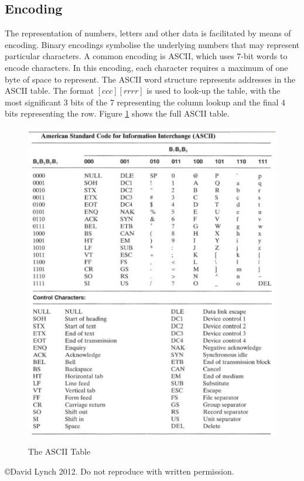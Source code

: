 \documentclass[10pt,a4paper]{article}
\begin{document}
\subsection{Encoding}
The representation of numbers, letters and other data is facilitated by means of encoding. Binary encodings symbolise the underlying numbers that may represent particular characters. A common encoding is ASCII, which uses 7-bit words to encode characters. In this encoding, each character requires a maximum of one byte of space to represent. The ASCII word structure represents addresses in the ASCII table. The format $[ccc][rrrr]$ is used to look-up the table, with the most significant 3 bits of the 7 representing the column lookup and the final 4 bits representing the row. Figure {\ref{ascii}} shows the full ASCII table. 
\begin{figure}
\caption{The ASCII Table\cite{LOGICDESIGN}}
\begin{center}
\includegraphics[scale=0.60]{../images/ascii.png}
\label{ascii}
\end{center}
\end{figure}
{}

\begin{center}
{\small \copyright  David Lynch 2012. Do not reproduce with written permission.}
\end{center}
\end{document}
